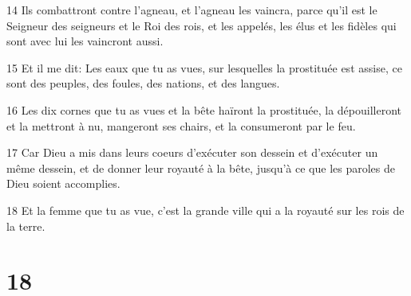 \par 14 Ils combattront contre l'agneau, et l'agneau les vaincra, parce qu'il est le Seigneur des seigneurs et le Roi des rois, et les appelés, les élus et les fidèles qui sont avec lui les vaincront aussi.
\par 15 Et il me dit: Les eaux que tu as vues, sur lesquelles la prostituée est assise, ce sont des peuples, des foules, des nations, et des langues.
\par 16 Les dix cornes que tu as vues et la bête haïront la prostituée, la dépouilleront et la mettront à nu, mangeront ses chairs, et la consumeront par le feu.
\par 17 Car Dieu a mis dans leurs coeurs d'exécuter son dessein et d'exécuter un même dessein, et de donner leur royauté à la bête, jusqu'à ce que les paroles de Dieu soient accomplies.
\par 18 Et la femme que tu as vue, c'est la grande ville qui a la royauté sur les rois de la terre.

\chapter{18}

